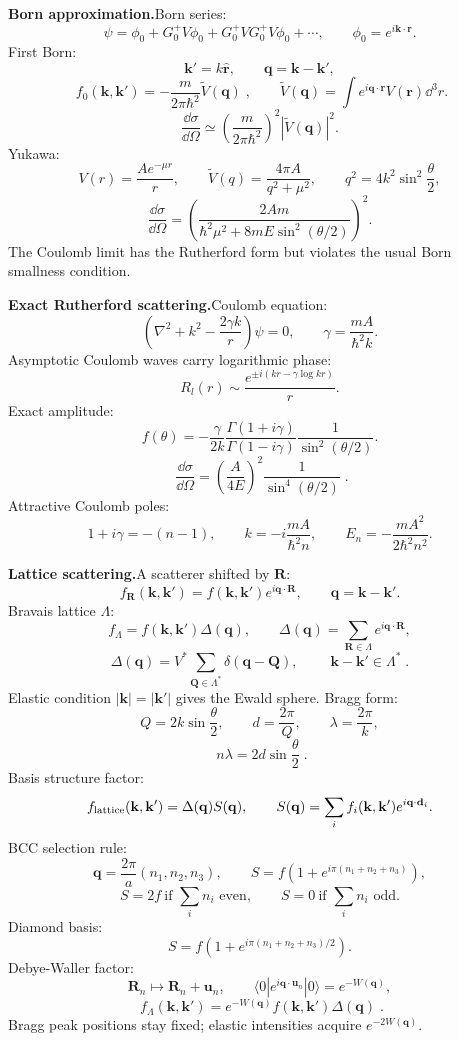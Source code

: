 \noindent\textbf{Born approximation.}\quad Born series:
\[
\psi=\phi_0+G_0^+V\phi_0+G_0^+VG_0^+V\phi_0+\cdots,\qquad
\phi_0=e^{i\mathbf k\cdot\mathbf r}.
\]
First Born:
\[
\mathbf k'=k\hat{\mathbf r},\qquad
\mathbf q=\mathbf k-\mathbf k',
\]
\[
\boxed{\;f_0(\mathbf k,\mathbf k')
=-\frac{m}{2\pi\hbar^2}\widetilde V(\mathbf q)\;},\qquad
\widetilde V(\mathbf q)=\int e^{i\mathbf q\cdot\mathbf r}V(\mathbf r)\dd^3r.
\]
\[
\frac{\dd\sigma}{\dd\Omega}\simeq
\left(\frac{m}{2\pi\hbar^2}\right)^2|\widetilde V(\mathbf q)|^2.
\]
Yukawa:
\[
V(r)=\frac{Ae^{-\mu r}}{r},\qquad
\widetilde V(q)=\frac{4\pi A}{q^2+\mu^2},\qquad
q^2=4k^2\sin^2\frac{\theta}{2},
\]
\[
\frac{\dd\sigma}{\dd\Omega}
=\left(\frac{2Am}{\hbar^2\mu^2+8mE\sin^2(\theta/2)}\right)^2.
\]
The Coulomb limit has the Rutherford form but violates the usual Born smallness
condition.

\noindent\textbf{Exact Rutherford scattering.}\quad Coulomb equation:
\[
\left(\nabla^2+k^2-\frac{2\gamma k}{r}\right)\psi=0,\qquad
\gamma=\frac{mA}{\hbar^2k}.
\]
Asymptotic Coulomb waves carry logarithmic phase:
\[
R_l(r)\sim\frac{e^{\pm i(kr-\gamma\log kr)}}{r}.
\]
Exact amplitude:
\[
f(\theta)=-\frac{\gamma}{2k}
\frac{\Gamma(1+i\gamma)}{\Gamma(1-i\gamma)}
\frac1{\sin^2(\theta/2)}.
\]
\[
\boxed{\;\frac{\dd\sigma}{\dd\Omega}
=\left(\frac{A}{4E}\right)^2\frac1{\sin^4(\theta/2)}\;}.
\]
Attractive Coulomb poles:
\[
1+i\gamma=-(n-1),\qquad
k=-i\frac{mA}{\hbar^2n},\qquad
E_n=-\frac{mA^2}{2\hbar^2n^2}.
\]

\noindent\textbf{Lattice scattering.}\quad A scatterer shifted by $\mathbf R$:
\[
f_{\mathbf R}(\mathbf k,\mathbf k')=f(\mathbf k,\mathbf k')
e^{i\mathbf q\cdot\mathbf R},\qquad
\mathbf q=\mathbf k-\mathbf k'.
\]
Bravais lattice $\Lambda$:
\[
f_\Lambda=f(\mathbf k,\mathbf k')\Delta(\mathbf q),\qquad
\Delta(\mathbf q)=\sum_{\mathbf R\in\Lambda}e^{i\mathbf q\cdot\mathbf R},
\]
\[
\Delta(\mathbf q)=V^*\sum_{\mathbf Q\in\Lambda^*}\delta(\mathbf q-\mathbf Q),
\qquad
\boxed{\;\mathbf k-\mathbf k'\in\Lambda^*\;}.
\]
Elastic condition $|\mathbf k|=|\mathbf k'|$ gives the Ewald sphere. Bragg form:
\[
Q=2k\sin\frac{\theta}{2},\qquad d=\frac{2\pi}{Q},\qquad
\lambda=\frac{2\pi}{k},
\]
\[
\boxed{\;n\lambda=2d\sin\frac{\theta}{2}\;}.
\]
Basis structure factor:
\[
f_{\rm lattice}(\mathbf k,\mathbf k')=\Delta(\mathbf q)S(\mathbf q),\qquad
S(\mathbf q)=\sum_if_i(\mathbf k,\mathbf k')e^{i\mathbf q\cdot\mathbf d_i}.
\]
BCC selection rule:
\[
\mathbf q=\frac{2\pi}{a}(n_1,n_2,n_3),\qquad
S=f\left(1+e^{i\pi(n_1+n_2+n_3)}\right),
\]
\[
S=2f\ \text{if }\sum_in_i\text{ even},\qquad
S=0\ \text{if }\sum_in_i\text{ odd}.
\]
Diamond basis:
\[
S=f\left(1+e^{i\pi(n_1+n_2+n_3)/2}\right).
\]
Debye-Waller factor:
\[
\mathbf R_n\mapsto\mathbf R_n+\mathbf u_n,\qquad
\langle0|e^{i\mathbf q\cdot\mathbf u_n}|0\rangle=e^{-W(\mathbf q)},
\]
\[
\boxed{\;f_\Lambda(\mathbf k,\mathbf k')
=e^{-W(\mathbf q)}f(\mathbf k,\mathbf k')\Delta(\mathbf q)\;}.
\]
Bragg peak positions stay fixed; elastic intensities acquire $e^{-2W(\mathbf q)}$.
